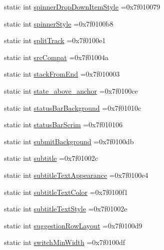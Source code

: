 \begin{DoxyCompactItemize}
\item 
static int \hyperlink{classandroid_1_1support_1_1v4_1_1R_1_1attr_aa39c1fbe3c6886d7c6b48dfd88da6591}{spinner\+Drop\+Down\+Item\+Style} =0x7f010079
\item 
static int \hyperlink{classandroid_1_1support_1_1v4_1_1R_1_1attr_ad20f2744efe2d759417593eaadb38d74}{spinner\+Style} =0x7f0100b8
\item 
static int \hyperlink{classandroid_1_1support_1_1v4_1_1R_1_1attr_ac4a39d568e4a2e6074984c53e7769d38}{split\+Track} =0x7f0100e1
\item 
static int \hyperlink{classandroid_1_1support_1_1v4_1_1R_1_1attr_a575eb70d456063d9e25b233ada1f5e71}{src\+Compat} =0x7f01004a
\item 
static int \hyperlink{classandroid_1_1support_1_1v4_1_1R_1_1attr_a3892c5fa02408b8236ce91dc60047e54}{stack\+From\+End} =0x7f010003
\item 
static int \hyperlink{classandroid_1_1support_1_1v4_1_1R_1_1attr_aa2c47414936c3a0a1beddb34c7bd2fa5}{state\+\_\+above\+\_\+anchor} =0x7f0100ce
\item 
static int \hyperlink{classandroid_1_1support_1_1v4_1_1R_1_1attr_a988668d48b62eb5d6612a421ffecbc58}{status\+Bar\+Background} =0x7f01010c
\item 
static int \hyperlink{classandroid_1_1support_1_1v4_1_1R_1_1attr_aed3472edce6d14c66adbc8ad231aecff}{status\+Bar\+Scrim} =0x7f010106
\item 
static int \hyperlink{classandroid_1_1support_1_1v4_1_1R_1_1attr_a02223c24d2cfe93197a2ab46075d2c1a}{submit\+Background} =0x7f0100db
\item 
static int \hyperlink{classandroid_1_1support_1_1v4_1_1R_1_1attr_a6a1cb8c7505d353bab12b766346b0219}{subtitle} =0x7f01002c
\item 
static int \hyperlink{classandroid_1_1support_1_1v4_1_1R_1_1attr_ae6695109829524a637cedde0ea0f40a1}{subtitle\+Text\+Appearance} =0x7f0100e4
\item 
static int \hyperlink{classandroid_1_1support_1_1v4_1_1R_1_1attr_a3a89f0ff3e533851db757c20a54dae88}{subtitle\+Text\+Color} =0x7f0100f1
\item 
static int \hyperlink{classandroid_1_1support_1_1v4_1_1R_1_1attr_a13ed407cca47c2a56528aa612128ea4c}{subtitle\+Text\+Style} =0x7f01002e
\item 
static int \hyperlink{classandroid_1_1support_1_1v4_1_1R_1_1attr_a665c196172c2b516ee034b8ef773a9a0}{suggestion\+Row\+Layout} =0x7f0100d9
\item 
static int \hyperlink{classandroid_1_1support_1_1v4_1_1R_1_1attr_a7c019492c8733534606bb32dc3cc6df5}{switch\+Min\+Width} =0x7f0100df

\end{DoxyCompactItemize}
